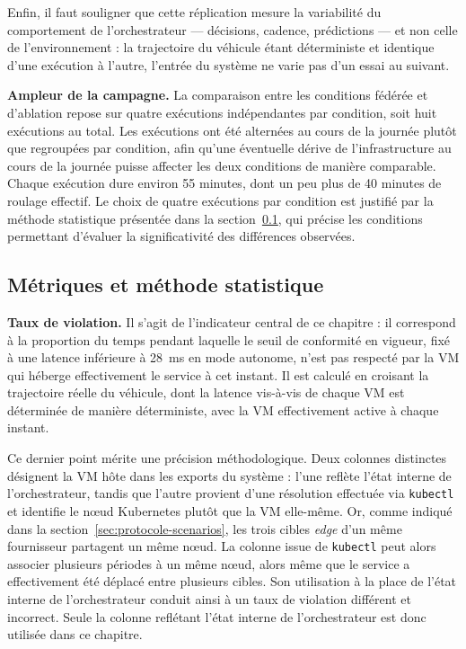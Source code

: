 Enfin, il faut souligner que cette réplication mesure la variabilité du comportement de l'orchestrateur — décisions, cadence, prédictions — et non celle de l'environnement : la trajectoire du véhicule étant déterministe et identique d'une exécution à l'autre, l'entrée du système ne varie pas d'un essai au suivant.

\textbf{Ampleur de la campagne.} La comparaison entre les conditions fédérée et d'ablation repose sur quatre exécutions indépendantes par condition, soit huit exécutions au total. Les exécutions ont été alternées au cours de la journée plutôt que regroupées par condition, afin qu'une éventuelle dérive de l'infrastructure au cours de la journée puisse affecter les deux conditions de manière comparable. Chaque exécution dure environ 55 minutes, dont un peu plus de 40 minutes de roulage effectif. Le choix de quatre exécutions par condition est justifié par la méthode statistique présentée dans la section~\ref{sec:protocole-metriques}, qui précise les conditions permettant d'évaluer la significativité des différences observées.

\subsection{Métriques et méthode statistique}
\label{sec:protocole-metriques}

\textbf{Taux de violation.} Il s'agit de l'indicateur central de ce chapitre : il correspond à la proportion du temps pendant laquelle le seuil de conformité en vigueur, fixé à une latence inférieure à 28~ms en mode autonome, n'est pas respecté par la VM qui héberge effectivement le service à cet instant. Il est calculé en croisant la trajectoire réelle du véhicule, dont la latence vis-à-vis de chaque VM est déterminée de manière déterministe, avec la VM effectivement active à chaque instant.

Ce dernier point mérite une précision méthodologique. Deux colonnes distinctes désignent la VM hôte dans les exports du système : l'une reflète l'état interne de l'orchestrateur, tandis que l'autre provient d'une résolution effectuée via \texttt{kubectl} et identifie le nœud Kubernetes plutôt que la VM elle-même. Or, comme indiqué dans la section~\ref{sec:protocole-scenarios}, les trois cibles \emph{edge} d'un même fournisseur partagent un même nœud. La colonne issue de \texttt{kubectl} peut alors associer plusieurs périodes à un même nœud, alors même que le service a effectivement été déplacé entre plusieurs cibles. Son utilisation à la place de l'état interne de l'orchestrateur conduit ainsi à un taux de violation différent et incorrect. Seule la colonne reflétant l'état interne de l'orchestrateur est donc utilisée dans ce chapitre.

